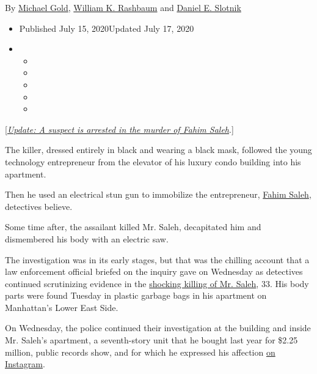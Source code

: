 By \href{https://www.nytimes3xbfgragh.onion/by/michael-gold}{Michael
Gold},
\href{https://www.nytimes3xbfgragh.onion/by/william-k-rashbaum}{William
K. Rashbaum} and
\href{https://www.nytimes3xbfgragh.onion/by/daniel-e-slotnik}{Daniel E.
Slotnik}

\begin{itemize}
\item
  Published July 15, 2020Updated July 17, 2020
\item
  \begin{itemize}
  \item
  \item
  \item
  \item
  \item
  \end{itemize}
\end{itemize}

{[}\href{https://www.nytimes3xbfgragh.onion/2020/07/17/nyregion/fahim-saleh-murder-arrest-tyrese-devon-haspil.html}{\emph{Update:
A suspect is arrested in the murder of Fahim Saleh}}.{]}

The killer, dressed entirely in black and wearing a black mask, followed
the young technology entrepreneur from the elevator of his luxury condo
building into his apartment.

Then he used an electrical stun gun to immobilize the entrepreneur,
\href{https://www.nytimes3xbfgragh.onion/2020/07/17/nyregion/fahim-saleh-killing-murder.html}{Fahim
Saleh}, detectives believe.

Some time after, the assailant killed Mr. Saleh, decapitated him and
dismembered his body with an electric saw.

The investigation was in its early stages, but that was the chilling
account that a law enforcement official briefed on the inquiry gave on
Wednesday as detectives continued scrutinizing evidence in the
\href{https://www.nytimes3xbfgragh.onion/2020/07/14/nyregion/dismembered-body-houston-street-manhattan.html?module=inline}{shocking
killing of Mr. Saleh}, 33. His body parts were found Tuesday in plastic
garbage bags in his apartment on Manhattan's Lower East Side.

On Wednesday, the police continued their investigation at the building
and inside Mr. Saleh's apartment, a seventh-story unit that he bought
last year for \$2.25 million, public records show, and for which he
expressed his affection
\href{https://www.instagram.com/p/B6KF3XglNbg/}{on Instagram}.

